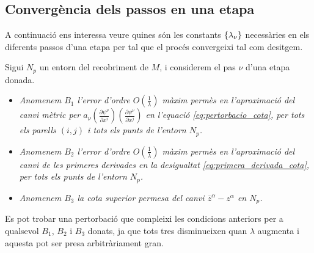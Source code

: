\subsection{Convergència dels passos en una etapa}
A continuació ens interessa veure quines són les constants $\{\lambda_\nu\}$ necessàries en els diferents passos d'una etapa per tal que el procés convergeixi tal com desitgem.
\begin{defi}
    Sigui $N_p$ un entorn del recobriment de $M$, i considerem el pas $\nu$ d'una etapa donada.
\end{defi}
\begin{itemize}\label{def: B1 B2 B3}
    \item \textit{Anomenem $B_1$ l'error d'ordre $O\left(\frac1{\lambda}\right)$ màxim permès en l'aproximació del canvi mètric per $a_\nu\left(\frac{\partial\psi^\nu}{\partial x^i}\right)\left(\frac{\partial\psi^\nu}{\partial x^j}\right)$ en l'equació \eqref{eq:pertorbacio_cota}, per tots els parells $(i,j)$ i tots els punts de l'entorn $N_p$.}
    \item \textit{Anomenem $B_2$ l'error d'ordre $O\left(\frac1{\lambda}\right)$ màxim permès en l'aproximació del canvi de les primeres derivades en la desigualtat \eqref{eq:primera_derivada_cota}, per tots els punts de l'entorn $N_p$.}
    \item \textit{Anomenem $B_3$ la cota superior permesa del canvi $\overline{z}^\alpha - z^\alpha$ en $N_p$.}
\end{itemize}
\begin{obs}
    Es pot trobar una pertorbació que compleixi les condicions anteriors per a qualsevol $B_1$, $B_2$ i $B_3$ donats, ja que tots tres disminueixen quan $\lambda$ augmenta i aquesta pot ser presa arbitràriament gran.
\end{obs}

